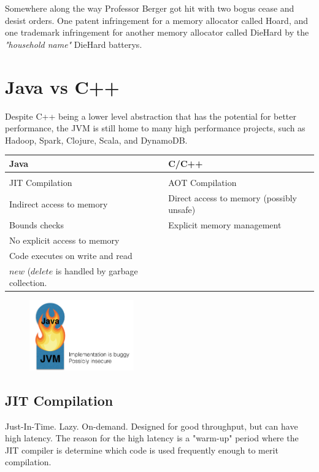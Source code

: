 \documentclass[twoside]{article}
\begin{document}
Somewhere along the way Professor Berger got hit with two bogus cease and desist orders. One patent infringement for a memory allocator called Hoard, and one trademark infringement for another memory allocator called DieHard by the \emph{"household name"} DieHard batterys.  

\section{Java vs C++}

Despite C++ being a lower level abstraction that has the potential for better performance, the JVM is still home to many high performance projects, such as Hadoop, Spark, Clojure, Scala, and DynamoDB.

\begin{tabular}{l | l}
Java & C/C++ \\
\hline \\
JIT Compilation & AOT Compilation \\ 
Indirect access to memory & Direct access to memory (possibly unsafe)\\
Bounds checks & Explicit memory management\\
No explicit access to memory & \\
Code executes on write and read & \\
$new$ ($delete$ is handled by garbage collection. & \\
\end{tabular}

\begin{figure}[h]
\begin{center}
\includegraphics[width=0.4\textwidth]{fire.png}
\end{center}
\end{figure}

\subsection{JIT Compilation}

Just-In-Time. Lazy. On-demand. Designed for good throughput, but can have high latency. The reason for the high latency is a "warm-up" period where the JIT compiler is determine which code is used frequently enough to merit compilation.
\end{document}
